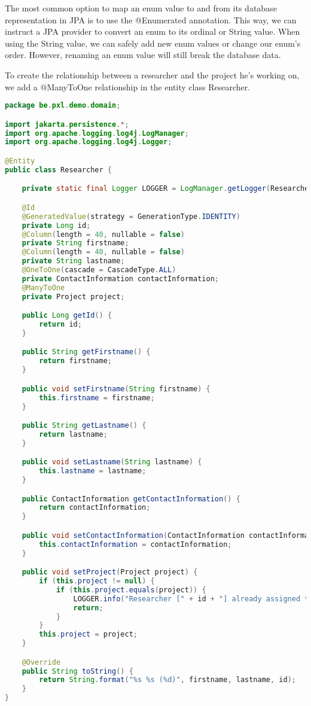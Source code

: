 The most common option to map an enum value to and from its database representation in JPA is to use the @Enumerated annotation. This way, we can instruct a JPA provider to convert an enum to its ordinal or String value.  When using the String value,  we can safely add new enum values or change our enum's order.  However, renaming an enum value will still break the database data.

To create the relationship between a researcher and the project he's working on, we add a @ManyToOne relationship in the entity class Researcher.

\begin{lstlisting}[frame=single,language=java]
package be.pxl.demo.domain;

import jakarta.persistence.*;
import org.apache.logging.log4j.LogManager;
import org.apache.logging.log4j.Logger;

@Entity
public class Researcher {

	private static final Logger LOGGER = LogManager.getLogger(Researcher.class);

	@Id
	@GeneratedValue(strategy = GenerationType.IDENTITY)
	private Long id;
	@Column(length = 40, nullable = false)
	private String firstname;
	@Column(length = 40, nullable = false)
	private String lastname;
	@OneToOne(cascade = CascadeType.ALL)
	private ContactInformation contactInformation;
	@ManyToOne
	private Project project;

	public Long getId() {
		return id;
	}

	public String getFirstname() {
		return firstname;
	}

	public void setFirstname(String firstname) {
		this.firstname = firstname;
	}

	public String getLastname() {
		return lastname;
	}

	public void setLastname(String lastname) {
		this.lastname = lastname;
	}

	public ContactInformation getContactInformation() {
		return contactInformation;
	}

	public void setContactInformation(ContactInformation contactInformation) {
		this.contactInformation = contactInformation;
	}

	public void setProject(Project project) {
		if (this.project != null) {
			if (this.project.equals(project)) {
				LOGGER.info("Researcher [" + id + "] already assigned to [" + project.getName() + "]");
				return;
			}
		}
		this.project = project;
	}

	@Override
	public String toString() {
		return String.format("%s %s (%d)", firstname, lastname, id);
	}
}
\end{lstlisting}

